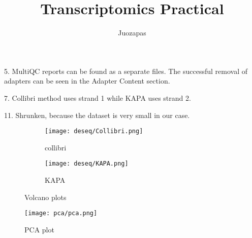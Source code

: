 \documentclass{article}
\title{Transcriptomics Practical}
\author{Juozapas}
\begin{document}
\maketitle

5. MultiQC reports can be found as a separate files.
The successful removal of adapters can be seen in the Adapter Content section.

7. Collibri method uses strand 1 while KAPA uses strand 2.


11. Shrunken, because the dataset is very small in our case.


\begin{figure}
  \centering
  \begin{subfigure}{0.4\textwidth}
    \texttt{[image: deseq/Collibri.png]}
    \caption{collibri}
  \end{subfigure}
  \hfill
  \begin{subfigure}{0.4\textwidth}
    \texttt{[image: deseq/KAPA.png]}
    \caption{KAPA}
  \end{subfigure}
  \caption{Volcano plots}
  \label{fig:volcanos}
\end{figure}

\begin{figure}
  \centering
  \texttt{[image: pca/pca.png]}
  \caption{PCA plot}
  \label{fig:pca}
\end{figure}
\end{document}
